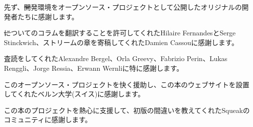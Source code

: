 \documentclass[a4paper,10pt,twoside]{book}
\begin{document}
先ず、\st 開発環境をオープンソース・プロジェクトとして公開したオリジナルの開発者たちに感謝します。

\st についてのコラムを翻訳することを許可してくれたHilaire FernandesとSerge Stinckwich、ストリームの章を寄稿してくれたDamien Cassouに感謝します。

査読をしてくれたAlexandre Bergel、Orla Greevy、Fabrizio Perin、Lukas Renggli、Jorge Ressia、Erwann Wernliに特に感謝します。

このオープンソース・プロジェクトを快く援助し、この本のウェブサイトを設置してくれたベルン大学(スイス)に感謝します。

この本のプロジェクトを熱心に支援して、初版の間違いを教えてくれたSqueakのコミュニティに感謝します。

\ifx\wholebook\relax\else
   
   
\end{document}
